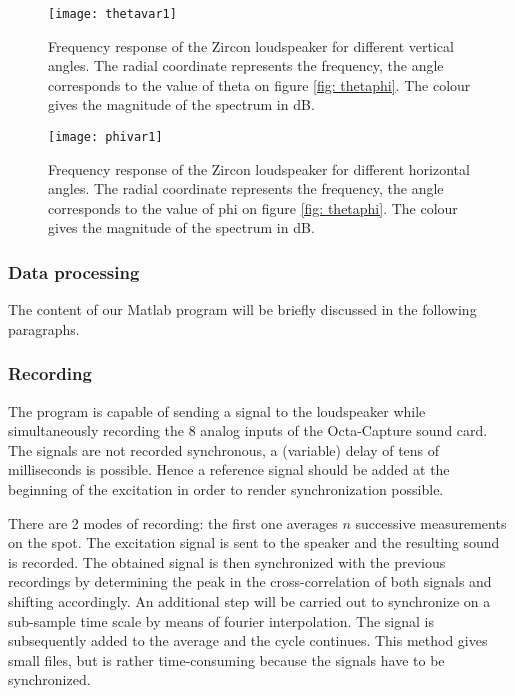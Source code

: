 \begin{figure}[h!]
  \centering
    \texttt{[image: thetavar1]}
  \caption{Frequency response of the Zircon loudspeaker for different vertical angles. The radial coordinate represents the frequency, the angle corresponds to the value of theta on figure \ref{fig: thetaphi}. The colour gives the magnitude of the spectrum in dB.}
  \label{fig: thetavar}
\end{figure}

\begin{figure}[h!]
  \centering
    \texttt{[image: phivar1]}
  \caption{Frequency response of the Zircon loudspeaker for different horizontal angles. The radial coordinate represents the frequency, the angle corresponds to the value of phi on figure \ref{fig: thetaphi}. The colour gives the magnitude of the spectrum in dB.}
  \label{fig: phivar}
\end{figure}




\subsubsection{Data processing}\label{processing}
The content of our Matlab program will be briefly discussed in the following paragraphs. 
\subsubsection*{Recording}
\vspace{-15pt}
The program is capable of sending a signal to the loudspeaker while simultaneously recording the 8 analog inputs of the Octa-Capture sound card. The signals are not recorded synchronous, a (variable) delay of tens of  milliseconds is possible. Hence a reference signal should be added at the beginning of the excitation in order to render synchronization possible.

There are 2 modes of recording: the first one averages $n$ successive measurements on the spot. The excitation signal is sent to the speaker and the resulting sound is recorded. The obtained signal is then synchronized with the previous recordings by determining the peak in the cross-correlation of both signals and shifting accordingly. An additional step will be carried out to synchronize on a sub-sample time scale by means of fourier interpolation. The signal is subsequently added to the average and the cycle continues. This method gives small files, but is rather time-consuming because the signals have to be synchronized.

